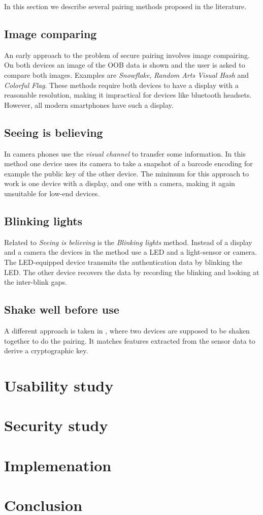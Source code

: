 \documentclass[conference, 11pt]{sty/IEEEtran}
\begin{document}
In this section we describe several pairing methods proposed in the literature.

\subsection{Image comparing}
An early approach to the problem of secure pairing involves image compairing.
On both devices an image of the OOB data is shown and the user is asked to compare both images.
Examples are \textit{Snowflake}\cite{goldberg1996visual}, \textit{Random Arts Visual Hash}\cite{perrig1999hash} and \textit{Colorful Flag}\cite{dohrmann2002public}.
These methods require both devices to have a display with a reasonable resolution, making it impractical for devices like bluetooth headsets. However, all modern smartphones have such a display.

\subsection{Seeing is believing}
In \cite{mccune2005seeing} camera phones use the \textit{visual channel} to transfer some information. In this method one device uses its camera to take a snapshot of a barcode encoding for example the public key of the other device. The minimum for this approach to work is one device with a display, and one with a camera, making it again unsuitable for low-end devices.

\subsection{Blinking lights}
Related to \textit{Seeing is believing} is the \textit{Blinking lights} method.
Instead of a display and a camera the devices in the method use a LED and a light-sensor or camera.
The LED-equipped device transmits the authentication data by blinking the LED.
The other device recovers the data by recording the blinking and looking at the inter-blink gaps.

\subsection{Shake well before use}
A different approach is taken in \cite{mayrhofer2009shake}, where two devices are supposed to be shaken together to do the pairing.
It matches features extracted from the sensor data to derive a cryptographic key.

\section{Usability study}

\section{Security study}

\section{Implemenation}

\section{Conclusion}
\label{sec:conclusion}



\end{document}
